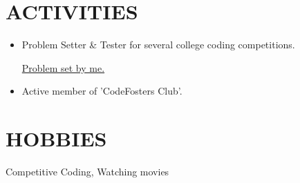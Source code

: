 \documentclass[line, margin]{res}
\begin{document}
\begin{resume}
\section{ACTIVITIES}
\begin{itemize}
\item Problem Setter \& Tester for several college coding competitions.

\href{https://drive.google.com/open?id=150YyyLzaqZVhkNDS19aG1i4u6s5tZCS1n3GMEuXRi1M}{Problem set by me.}
\item Active member of 'CodeFosters Club'.
\end{itemize}

\section{HOBBIES}
Competitive Coding, Watching movies

\end{resume}
\end{document}
